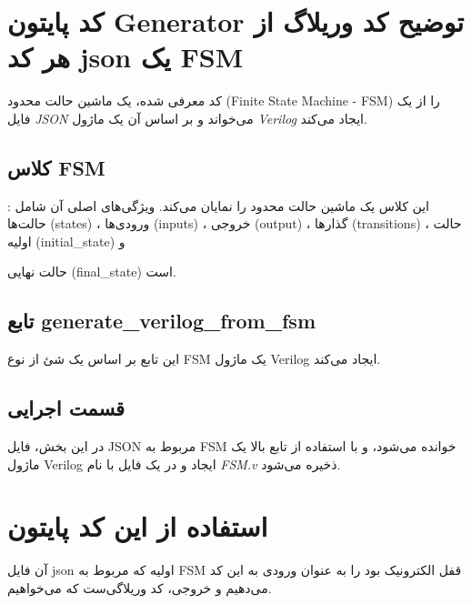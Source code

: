 \newpage

\section*{کد پایتون Generator توضیح کد وریلاگ از هر کد json یک FSM}


کد معرفی شده، یک ماشین حالت محدود (Finite State Machine - FSM) را از یک فایل \textit{JSON} می‌خواند و بر اساس آن یک ماژول \textit{Verilog} ایجاد می‌کند.

\subsection*{کلاس FSM}

این کلاس یک ماشین حالت محدود را نمایان می‌کند. ویژگی‌های اصلی آن شامل : حالت‌ها (states) ، ورودی‌ها (inputs) ، خروجی (output) ، گذارها (transitions) ، حالت اولیه (initial\_state) و 

حالت نهایی (final\_state) است.

\subsection*{تابع generate\_verilog\_from\_fsm}

این تابع بر اساس یک شئ از نوع FSM یک ماژول Verilog ایجاد می‌کند. 

\subsection*{قسمت اجرایی}

در این بخش، فایل JSON مربوط به FSM خوانده می‌شود، و با استفاده از تابع بالا یک ماژول Verilog ایجاد و در یک فایل با نام \textit{FSM.v} ذخیره می‌شود.

\newpage

\section*{استفاده از این کد پایتون}

آن فایل json اولیه که مربوط به FSM قفل الکترونیک بود را به عنوان ورودی به این کد می‌دهیم و خروجی، کد وریلاگی‌ست که می‌خواهیم.